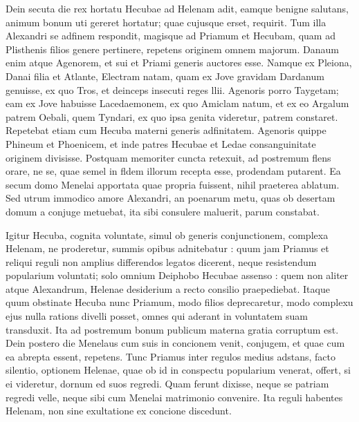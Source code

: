 \documentclass{article}
\begin{document}
\begin{pages}
\begin{Rightside}
Dein secuta die rex hortatu Hecubae ad Helenam adit, eamque benigne salutans, animum bonum uti gereret hortatur; quae cujusque erset, requirit. Tum illa Alexandri se adfinem respondit, magisque ad Priamum et Hecubam, quam ad Plisthenis filios genere pertinere, repetens originem omnem majorum. Danaum enim atque Agenorem, et sui et Priami generis auctores esse. Namque ex Pleiona, Danai filia et Atlante, Electram natam, quam ex Jove gravidam Dardanum genuisse, ex quo Tros, et deinceps insecuti reges llii. Agenoris porro Taygetam; eam ex Jove habuisse Lacedaemonem, ex quo Amiclam natum, et ex eo Argalum patrem Oebali, quem Tyndari, ex quo ipsa genita videretur, patrem constaret. Repetebat etiam cum Hecuba materni generis adfinitatem. Agenoris quippe Phineum et Phoenicem, et inde patres Hecubae et Ledae consanguinitate originem divisisse. Postquam memoriter cuncta retexuit, ad postremum flens orare, ne se, quae semel in fldem illorum recepta esse, prodendam putarent. Ea secum domo Menelai apportata quae propria fuissent, nihil praeterea ablatum. Sed utrum immodico amore Alexandri, an poenarum metu, quas ob desertam domum a conjuge metuebat, ita sibi consulere maluerit, parum constabat.

Igitur Hecuba, cognita voluntate, simul ob generis conjunctionem, complexa Helenam, ne proderetur, summis opibus adnitebatur : quum jam Priamus et reliqui reguli non amplius differendos legatos dicerent, neque resistendum popularium voluntati; solo omnium Deiphobo Hecubae assenso : quem non aliter atque Alexandrum, Helenae desiderium a recto consilio praepediebat. Itaque quum obstinate Hecuba nunc Priamum, modo filios deprecaretur, modo complexu ejus nulla rations divelli posset, omnes qui aderant in voluntatem suam transduxit. Ita ad postremum bonum publicum materna gratia corruptum est. Dein postero die Menelaus cum suis in concionem venit, conjugem, et quae cum ea abrepta essent, repetens. Tunc Priamus inter regulos medius adstans, facto silentio, optionem Helenae, quae ob id in conspectu popularium venerat, offert, si ei videretur, dornum ed suos regredi. Quam ferunt dixisse, neque se patriam regredi velle, neque sibi cum Menelai matrimonio convenire. Ita reguli habentes Helenam, non sine exultatione ex concione discedunt.


\endnumbering
\end{Rightside}

\end{pages}
\Pages
\end{document}
